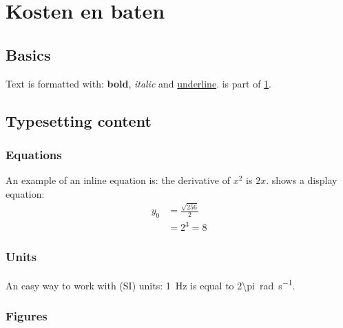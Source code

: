 \chapter{Kosten en baten} \label{cha:your-first-document}


\section{Basics} \label{sec:basics}

Text is formatted with: \textbf{bold}, \textit{italic} and \underline{underline}.
 is part of \cref{cha:your-first-document}.


\section{Typesetting content} \label{sec:typesetting}


\subsection{Equations} \label{subsec:equations}

An example of an inline equation is: the derivative of $x^2$ is $2x$.  shows a display equation:
\begin{align} \label{eq:example}
          y_{0} &= \frac{\sqrt{256}}{2} \\
                &= 2^{3} = 8 \nonumber 
\end{align}


\subsection{Units} \label{subsec:units}

An easy way to work with (SI) units: \SI{1}{\hertz} is equal to \SI{2\pi}{\radian\per\second}.


\subsection{Figures} \label{subsec:figures}

